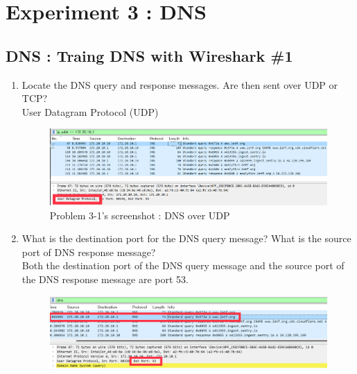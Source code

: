 \section{Experiment 3 : DNS}
\subsection{DNS : Traing DNS with Wireshark \#1}
    \begin{enumerate}[label=\bfseries Problem \arabic*:,leftmargin=*,labelindent=1em]
        \item Locate the DNS query and response messages. Are then sent over UDP or TCP?\\[0.2mm]
            \soln User Datagram Protocol (UDP)
            \vspace{-2mm}  
            \begin{figure}[!h]\centering
        		\includegraphics[width=.78\textwidth]{image/result_week01/Q3-1.png}
        		\caption{\footnotesize Problem 3-1's screenshot : DNS over UDP}
        		\vspace{-10pt}
            \end{figure}
        \item What is the destination port for the DNS query message? 
        What is the source port of DNS response message?\\[0.2mm]
            \soln Both the destination port of the DNS query message and the source port of the DNS response message are port 53.
            \vspace{-2mm}  
            \begin{figure}[!h]\centering
        		\includegraphics[width=.78\textwidth]{image/result_week01/Q3-2-1.png}

\end{figure}
\end{enumerate}
